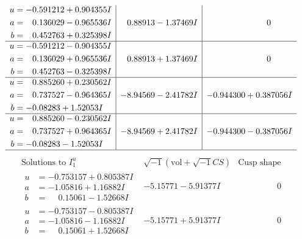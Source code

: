 \documentclass[1p]{elsarticle_modified}
\theoremstyle{definition}
\newcommand{\I}{\sqrt{-1}}
\begin{document}
$$\begin{array}{c|c|c}
\begin{aligned}
u &= -0.591212 + 0.904355 I \\
a &= \phantom{-}0.136029 - 0.965536 I \\
b &= \phantom{-}0.452763 + 0.325398 I\end{aligned}
 & \phantom{-}0.88913 - 1.37469 I & \phantom{-0.000000 } 0 \\ \hline\begin{aligned}
u &= -0.591212 - 0.904355 I \\
a &= \phantom{-}0.136029 + 0.965536 I \\
b &= \phantom{-}0.452763 - 0.325398 I\end{aligned}
 & \phantom{-}0.88913 + 1.37469 I & \phantom{-0.000000 } 0 \\ \hline\begin{aligned}
u &= \phantom{-}0.885260 + 0.230562 I \\
a &= \phantom{-}0.737527 - 0.964365 I \\
b &= -0.08283 + 1.52053 I\end{aligned}
 & -8.94569 - 2.41782 I & -0.944300 + 0.387056 I \\ \hline\begin{aligned}
u &= \phantom{-}0.885260 - 0.230562 I \\
a &= \phantom{-}0.737527 + 0.964365 I \\
b &= -0.08283 - 1.52053 I\end{aligned}
 & -8.94569 + 2.41782 I & -0.944300 - 0.387056 I\\
 \hline 
 \end{array}$$\newpage$$\begin{array}{c|c|c}  
\text{Solutions to }I^u_{1}& \I (\text{vol} + \sqrt{-1}CS) & \text{Cusp shape}\\
 \hline 
\begin{aligned}
u &= -0.753157 + 0.805387 I \\
a &= -1.05816 + 1.16882 I \\
b &= \phantom{-}0.15061 - 1.52668 I\end{aligned}
 & -5.15771 - 5.91377 I & \phantom{-0.000000 } 0 \\ \hline\begin{aligned}
u &= -0.753157 - 0.805387 I \\
a &= -1.05816 - 1.16882 I \\
b &= \phantom{-}0.15061 + 1.52668 I\end{aligned}
 & -5.15771 + 5.91377 I & \phantom{-0.000000 } 0 \\ \hline\begin{aligned}

\end{aligned}
\end{array}$$
\end{document}
